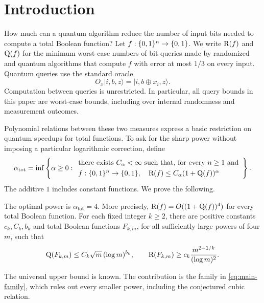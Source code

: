\section{Introduction}\label{sec:introduction}

How much can a quantum algorithm reduce the number of input bits needed
to compute a total Boolean function? Let $f:\{0,1\}^n\to\{0,1\}$. We write
$\mathrm R(f)$ and $\mathrm Q(f)$ for the minimum worst-case numbers of bit queries made
by randomized and quantum algorithms that compute $f$ with error at most
$1/3$ on every input. Quantum queries use the standard oracle
\[
 O_x\lvert i,b,z\rangle=\lvert i,b\oplus x_i,z\rangle.
\]
Computation between queries is unrestricted. In particular, all query
bounds in this paper are worst-case bounds, including over internal
randomness and measurement outcomes.

Polynomial relations between these two measures express a basic
restriction on quantum speedups for total functions. To ask for the sharp
power without imposing a particular logarithmic correction, define
\begin{equation}\label{eq:alpha}
 \alpha_{\mathrm{tot}}=
 \inf\left\{\alpha\ge0:
 \begin{array}{l}
 \text{there exists }C_\alpha<\infty\text{ such that, for every }n\ge1\nobreak\text{ and}\smallskip\\
 f:\bits^n\to\bits,\quad
 \R(f)\le C_\alpha(1+\Q(f))^\alpha
 \end{array}\right\}.
\end{equation}
The additive $1$ includes constant functions. We prove the following.

\begin{theorem}\label{thm:main}
The optimal power is $\alpha_{\mathrm{tot}}=4$.
More precisely, $\mathrm R(f)=O((1+\mathrm Q(f))^4)$ for every total Boolean function.
For each fixed integer $k\ge2$, there are positive constants $c_k,C_k,b_k$
and total Boolean functions $F_{k,m}$, for all sufficiently large powers
of four $m$, such that
\begin{equation}\label{eq:main-family}
 \mathrm Q(F_{k,m})\le C_k\sqrt m\,(\log m)^{b_k},
 \qquad
 \mathrm R(F_{k,m})\ge c_k\frac{m^{2-1/k}}{(\log m)^2}.
\end{equation}
\end{theorem}

The universal upper bound is known. The contribution is the family in
\eqref{eq:main-family}, which rules out every smaller power, including
the conjectured cubic relation.

